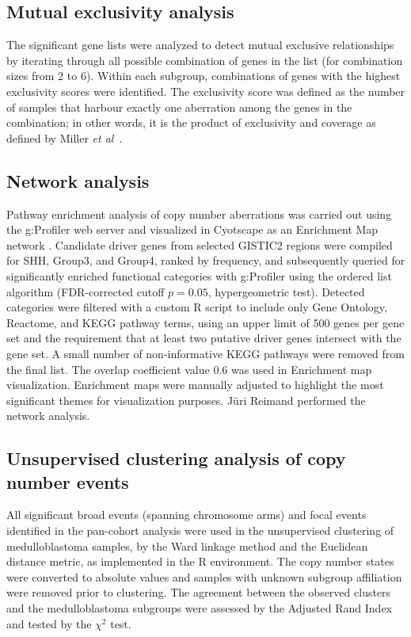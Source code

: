 \subsection{Mutual exclusivity analysis}

The significant gene lists were analyzed to detect mutual exclusive relationships by iterating through all possible combination of genes in the list (for combination sizes from 2 to 6). Within each subgroup, combinations of genes with the highest exclusivity scores were identified. The exclusivity score was defined as the number of samples that harbour exactly one aberration among the genes in the combination; in other words, it is the product of exclusivity and coverage as defined by Miller \emph{et al}\ .

\subsection{Network analysis}

Pathway enrichment analysis of copy number aberrations was carried out using the g:Profiler web server  and visualized in Cyotscape as an Enrichment Map network . Candidate driver genes from selected GISTIC2 regions were compiled for SHH, Group3, and Group4, ranked by frequency, and subsequently queried for significantly enriched functional categories with g:Profiler using the ordered list algorithm (FDR-corrected cutoff $p=0.05$, hypergeometric test). Detected categories were filtered with a custom R script to include only Gene Ontology, Reactome, and KEGG pathway terms, using an upper limit of 500 genes per gene set and the requirement that at least two putative driver genes intersect with the gene set. A small number of non-informative KEGG pathways were removed from the final list. The overlap coefficient value 0.6 was used in Enrichment map visualization.  Enrichment maps were manually adjusted to highlight the most significant themes for visualization purposes.  J\"{u}ri Reimand performed the network analysis.

\subsection{Unsupervised clustering analysis of copy number events}

All significant broad events (spanning chromosome arms) and focal events identified in the pan-cohort analysis were used in the unsupervised clustering of medulloblastoma samples, by the Ward linkage method and the Euclidean distance metric, as implemented in the R environment. The copy number states were converted to absolute values and samples with unknown subgroup affiliation were removed prior to clustering. The agreement between the observed clusters and the medulloblastoma subgroups were assessed by the Adjusted Rand Index and tested by the $\chi^2$ test.

